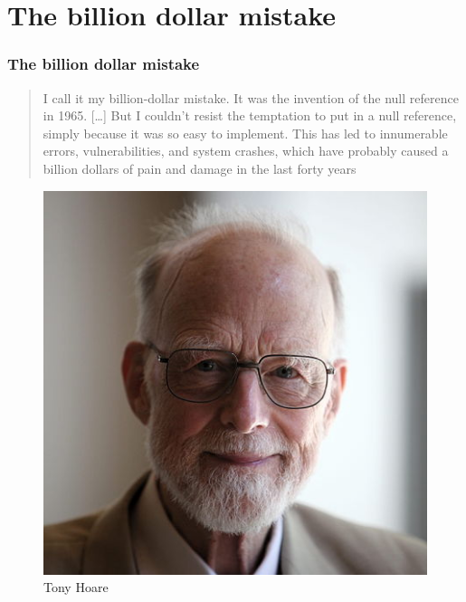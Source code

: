 \documentclass{beamer}
\begin{document}
\section{The billion dollar mistake}
\begin{frame}
  \frametitle{The billion dollar mistake}
  \begin{multicols}{2}
    \begin{quote}
      I call it my billion-dollar mistake. It was the invention of the
      null reference in 1965. [\ldots] But I couldn't resist the
      temptation to put in a null reference, simply because it was so
      easy to implement. This has led to innumerable errors,
      vulnerabilities, and system crashes, which have probably caused
      a billion dollars of pain and damage in the last forty years
    \end{quote}

    \columnbreak

    \begin{figure}
      \includegraphics[scale=0.2]{hoare.jpg}
      \caption{Tony Hoare}
    \end{figure}
  \end{multicols}
\end{frame}
\end{document}
